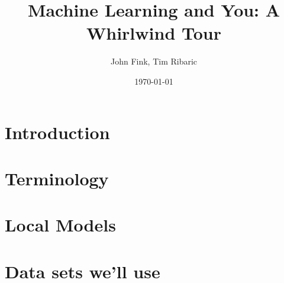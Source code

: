 \documentclass{beamer}
\title{Machine Learning and You: A Whirlwind Tour}
\author{John Fink, Tim Ribaric}
\date{\today}
\begin{document}
\frame{\titlepage}

\section[Outline]{}
\frame{\tableofcontents}

\section{Introduction}
\frame

\section{Terminology}
\frame

\section{Local Models}
\frame

\section{Data sets we'll use}
\frame


\end{document}
